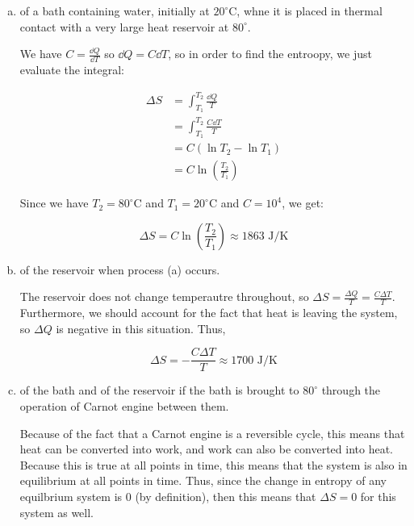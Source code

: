 \documentclass[10pt]{article}
\begin{document}
\begin{enumerate}[(a)]
\item of a bath containing water, initially at $20^\circ$C, whne it is placed in thermal contact with a very large heat reservoir at $80^\circ$. 

\begin{solution}
    We have $C = \frac{\dd Q}{\dd T}$ so $\dd Q = C \dd T$, so in order to find the entroopy, we just evaluate the integral:

    \begin{align*}
        \Delta S &= \int_{T_1}^{T_2} \frac{\dd Q}{T}\\
        &= \int_{T_1}^{T_2} \frac{C \dd T}{T} \\
        &= C(\ln T_2 - \ln T_1)\\
        &= C \ln \left(\frac{T_2}{T_1}\right)
    \end{align*}

    Since we have $T_2 = 80^\circ$C and $T_1 = 20^\circ$C and $C = 10^4$, we get:

    \[ \Delta S = C \ln \left(\frac{T_2}{T_1}\right) \approx 1863 \text{ J/K}\]


\end{solution}
\item of the reservoir when process (a) occurs. 

\begin{solution}
    The reservoir does not change temperautre throughout, so $\Delta S = \frac{\Delta Q}{T} = \frac{C \Delta T}{T}$. Furthermore, we should account for the fact that heat is leaving the system, so $\Delta Q$ is negative in this situation. Thus, 

    \[ \Delta S = -\frac{C \Delta T}{T} \approx 1700 \text{ J/K}\]


\end{solution}
\item of the bath and of the reservoir if the bath is brought to $80^\circ$ through the operation of Carnot engine between them.

\begin{solution}
    Because of the fact that a Carnot engine is a reversible cycle, this means that heat can be converted into work, and work can also be converted into heat. Because this is true at all points in time, this means that the system is also in equilibrium at all points in time. Thus, since the change in entropy of any equilbrium system is 0 (by definition), then this means that $\Delta S = 0$ for this system as well.
\end{solution}
\end{enumerate}
\end{document}
